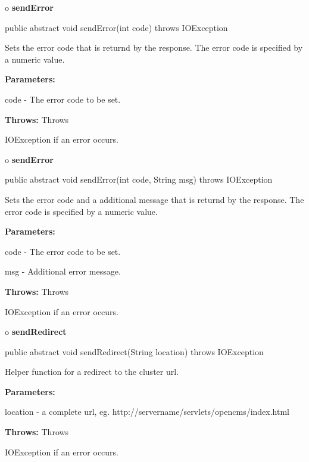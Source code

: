 o {\bf sendError} 

\begin{PRE}
 public abstract void sendError(int code) throws IOException
\end{PRE}

\begin{description}
\htmlDD Sets the error code that is returnd by the response. The error code is
specified by a numeric value. 

\begin{description}
\item {\bf Parameters:}  

code - The error code to be set.  
\item {\bf Throws:} Throws  

IOException if an error occurs.  
\end{description}

\end{description}

o {\bf sendError} 

\begin{PRE}
 public abstract void sendError(int code,
                                String msg) throws IOException
\end{PRE}

\begin{description}
\htmlDD Sets the error code and a additional message that is returnd by the
response. The error code is specified by a numeric value. 

\begin{description}
\item {\bf Parameters:}  

code - The error code to be set.  

msg - Additional error message.  
\item {\bf Throws:} Throws  

IOException if an error occurs.  
\end{description}

\end{description}

o {\bf sendRedirect} 

\begin{PRE}
 public abstract void sendRedirect(String location) throws IOException
\end{PRE}

\begin{description}
\htmlDD Helper function for a redirect to the cluster url. 

\begin{description}
\item {\bf Parameters:}  

location - a complete url, eg. http://servername/servlets/opencms/index.html  
\item {\bf Throws:} Throws  

IOException if an error occurs.  
\end{description}

\end{description}

